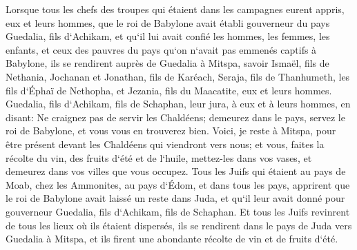 \verse Lorsque tous les chefs des troupes qui étaient dans les campagnes eurent appris, eux et leurs hommes, que le roi de Babylone avait établi gouverneur du pays Guedalia, fils d`Achikam, et qu`il lui avait confié les hommes, les femmes, les enfants, et ceux des pauvres du pays qu`on n`avait pas emmenés captifs à Babylone, 
\verse ils se rendirent auprès de Guedalia à Mitspa, savoir Ismaël, fils de Nethania, Jochanan et Jonathan, fils de Karéach, Seraja, fils de Thanhumeth, les fils d`Éphaï de Nethopha, et Jezania, fils du Maacatite, eux et leurs hommes. 
\verse Guedalia, fils d`Achikam, fils de Schaphan, leur jura, à eux et à leurs hommes, en disant: Ne craignez pas de servir les Chaldéens; demeurez dans le pays, servez le roi de Babylone, et vous vous en trouverez bien. 
\verse Voici, je reste à Mitspa, pour être présent devant les Chaldéens qui viendront vers nous; et vous, faites la récolte du vin, des fruits d`été et de l`huile, mettez-les dans vos vases, et demeurez dans vos villes que vous occupez. 
\verse Tous les Juifs qui étaient au pays de Moab, chez les Ammonites, au pays d`Édom, et dans tous les pays, apprirent que le roi de Babylone avait laissé un reste dans Juda, et qu`il leur avait donné pour gouverneur Guedalia, fils d`Achikam, fils de Schaphan. 
\verse Et tous les Juifs revinrent de tous les lieux où ils étaient dispersés, ils se rendirent dans le pays de Juda vers Guedalia à Mitspa, et ils firent une abondante récolte de vin et de fruits d`été. 
